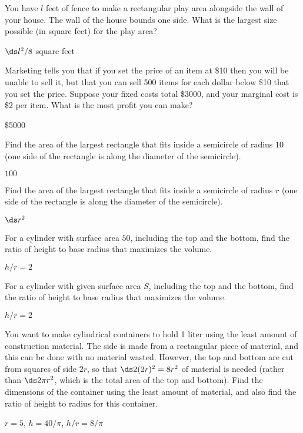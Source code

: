 \begin{exercises}
\exercise
You have $l$ feet of fence to make a rectangular play area alongside the
wall of your house.  The wall of the house bounds one side.  What is the
largest size possible (in square feet) for the play area?
\begin{answer} $\ds l^2/8$ square feet
\end{answer}

\exercise
Marketing tells you that if you set the price of an item at \$10
then you will be unable to sell it, but that you can sell 500 items for
each dollar below \$10 that you set the price.  Suppose your fixed costs total
\$3000, and your marginal cost is \$2 per item.  What is the most profit
you can make?
\label{ex:manufacturing}
\begin{answer} \$5000
\end{answer}

\exercise
Find the area of the largest rectangle that fits inside a semicircle of
radius $10$ (one side of the rectangle is along the diameter of the
semicircle).
\begin{answer} $100$
\end{answer}

\exercise
Find the area of the largest rectangle that fits inside a semicircle of
radius $r$ (one side of the rectangle is along the diameter of the
semicircle).
\begin{answer} $\ds r^2$
\end{answer}

\exercise
For a cylinder with surface area $50$, including 
the top and the bottom, find the ratio of height to
base radius that maximizes the volume.
\begin{answer} $h/r=2$
\end{answer}

\exercise
For a cylinder with given surface area $S$, including 
the top and the bottom, find the ratio of height to
base radius that maximizes the volume.
\begin{answer} $h/r=2$
\end{answer}

\exercise
You want to make cylindrical containers to hold 1 liter using the
least amount of construction material.  The side is made from a
rectangular piece of material, and this can be done with no material
wasted.  However, the top and bottom are cut from squares of side $2r$, so
that $\ds 2(2r)^2=8r^2$ of material is needed (rather than $\ds 2\pi r^2$, which is
the total area of the top and bottom).  Find the dimensions of the
container using the least amount of material, and also find the
ratio of height to
radius for this container.
\begin{answer} $r=5$, $h=40/\pi$, $h/r=8/\pi$
\end{answer}


\end{exercises}
